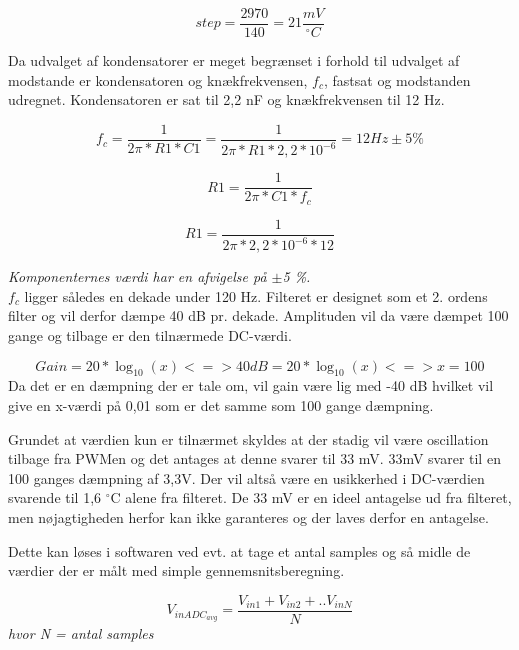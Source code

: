 \begin{equation}
step = \frac{2970}{140} = 21 \frac{mV}{^{\circ}C}
\end{equation}

Da udvalget af kondensatorer er meget begrænset i forhold til udvalget af modstande er kondensatoren og knækfrekvensen, $f_c$, fastsat og modstanden udregnet. Kondensatoren er sat til 2,2 nF og knækfrekvensen til 12 Hz. 

\begin{equation}
f_c = \frac{1}{2 \pi * R1 * C1} = \frac{1}{2 \pi * R1  * 2,2*10^{-6}} = 12 Hz\pm5 \%
\end{equation}

\begin{equation}
R1 = \frac{1}{2 \pi * C1  * f_c}
\end{equation}

\begin{equation}
R1 = \frac{1}{2 \pi * 2,2*10^{-6}  * 12}
\end{equation}

\textit{Komponenternes værdi har en afvigelse på $\pm$5 \%.}\\

$f_c$ ligger således en dekade under 120 Hz. Filteret er designet som et 2. ordens filter og vil derfor dæmpe 40 dB pr. dekade. Amplituden vil da være dæmpet 100 gange og tilbage er den tilnærmede DC-værdi. 

\begin{equation}
Gain = 20 * \log_{10}(x) <=> 40 dB = 20 * \log_ {10}(x) <=> x = 100
\end{equation} 
Da det er en dæmpning der er tale om, vil gain være lig med -40 dB hvilket vil give en x-værdi på 0,01 som er det samme som 100 gange dæmpning.

Grundet at værdien kun er tilnærmet skyldes at der stadig vil være oscillation tilbage fra PWMen og det antages at denne svarer til 33 mV. 33mV svarer til en 100 ganges dæmpning af 3,3V. Der vil altså være en usikkerhed i DC-værdien svarende til 1,6 $^{\circ}$C alene fra filteret. De 33 mV er en ideel antagelse ud fra filteret, men nøjagtigheden herfor kan ikke garanteres og der laves derfor en antagelse.

Dette kan løses i softwaren ved evt. at tage et antal samples og så midle de værdier der er målt med simple gennemsnitsberegning. 

\begin{equation}
V_{inADC_{avg}} = \frac{V_{in1} + V_{in2} + .. V_{inN}}{N}
\end{equation} 
\textit{hvor N = antal samples}

